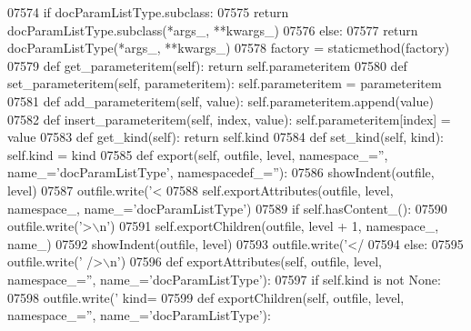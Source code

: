\begin{DoxyCode}
{{{{{{{{{{{{{{{{{{{{{{{{{{{{{{{{{{{{{{{{{{{{{{{{{{{{{{{{{{{{{{{{{{{{{{{{{{{{{{{{{{{{{{{{{{{{{{{{{{{{{{{{{{{{{{{{{{{{{{{{{{{{{{{{{{{{{{{{{{{{{{{{{{{{{{{{{{{{{{{{{{{{{{{{{{{{{{{{{{{{{{{{{{{{{{{{{{{{{{{{{{{{{{{{{{{{{{{{{{{{{{{{{{{{{{{{{{{{{{{{{{{{{{{{{{{{{{{{{{{{{{{{{{{{{{{{{{{{{{{{{{{{{{{{{{{{{{{{{{{{{{{{{{{{{{{{{{{{{{{{{{{{{{{{{{{{{{{{{{{{{{{{{{{{{{{{{{{{{{{{{{{{{{{{{{{{{{{{{{{{{{{{{{{{{{{{{{{{{{{{{{{{{{{{{{{{{{{{{{{{{{{{{{{{{{{{{{{{{{{{{{{{{{{{{{{{{{{{{{{{{{{{{{{{{{{{{{07574         \textcolor{keywordflow}{if} docParamListType.subclass:
07575             \textcolor{keywordflow}{return} docParamListType.subclass(*args\_, **kwargs\_)
07576         \textcolor{keywordflow}{else}:
07577             \textcolor{keywordflow}{return} docParamListType(*args\_, **kwargs\_)
07578     factory = staticmethod(factory)
07579     \textcolor{keyword}{def }get_parameteritem(self): \textcolor{keywordflow}{return} self.parameteritem
07580     \textcolor{keyword}{def }set_parameteritem(self, parameteritem): self.parameteritem = parameteritem
07581     \textcolor{keyword}{def }add_parameteritem(self, value): self.parameteritem.append(value)
07582     \textcolor{keyword}{def }insert_parameteritem(self, index, value): self.parameteritem[index] = value
07583     \textcolor{keyword}{def }get_kind(self): \textcolor{keywordflow}{return} self.kind
07584     \textcolor{keyword}{def }set_kind(self, kind): self.kind = kind
07585     \textcolor{keyword}{def }export(self, outfile, level, namespace\_='', name\_='docParamListType', namespacedef\_=''):
07586         showIndent(outfile, level)
07587         outfile.write(\textcolor{stringliteral}{'<%
07588         self.exportAttributes(outfile, level, namespace\_, name\_=\textcolor{stringliteral}{'docParamListType'})
07589         \textcolor{keywordflow}{if} self.hasContent_():
07590             outfile.write(\textcolor{stringliteral}{'>\(\backslash\)n'})
07591             self.exportChildren(outfile, level + 1, namespace\_, name\_)
07592             showIndent(outfile, level)
07593             outfile.write(\textcolor{stringliteral}{'</%
07594         \textcolor{keywordflow}{else}:
07595             outfile.write(\textcolor{stringliteral}{' />\(\backslash\)n'})
07596     \textcolor{keyword}{def }exportAttributes(self, outfile, level, namespace\_='', name\_='docParamListType'):
07597         \textcolor{keywordflow}{if} self.kind \textcolor{keywordflow}{is} \textcolor{keywordflow}{not} \textcolor{keywordtype}{None}:
07598             outfile.write(\textcolor{stringliteral}{' kind=%
07599     \textcolor{keyword}{def }exportChildren(self, outfile, level, namespace\_='', name\_='docParamListType'):
}}}}}}}}}}}}}}}}}}}}}}}}}}}}}}}}}}}}}}}}}}}}}}}}}}}}}}}}}}}}}}}}}}}}}}}}}}}}}}}}}}}}}}}}}}}}}}}}}}}}}}}}}}}}}}}}}}}}}}}}}}}}}}}}}}}}}}}}}}}}}}}}}}}}}}}}}}}}}}}}}}}}}}}}}}}}}}}}}}}}}}}}}}}}}}}}}}}}}}}}}}}}}}}}}}}}}}}}}}}}}}}}}}}}}}}}}}}}}}}}}}}}}}}}}}}}}}}}}}}}}}}}}}}}}}}}}}}}}}}}}}}}}}}}}}}}}}}}}}}}}}}}}}}}}}}}}}}}}}}}}}}}}}}}}}}}}}}}}}}}}}}}}}}}}}}}}}}}}}}}}}}}}}}}}}}}}}}}}}}}}}}}}}}}}}}}}}}}}}}}}}}}}}}}}}}}}}}}}}}}}}}}}}}}}}}}}}}}}}}}}}}}}}}}}}}}}}}}}}}}}}}}}}}}}}}}}}}}}
\end{DoxyCode}
